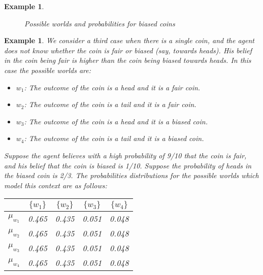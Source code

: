\documentclass[12pt]{article}
\newtheorem{example}[theorem]{Example}
\begin{document}
\begin{example}
{\begin{figure}
\begin{center}
\begin{tikzpicture}[->,>=stealth',shorten >=1pt,auto,node distance=3cm,main node/.style={}]
\end{tikzpicture}
\caption{Possible worlds and probabilities for biased coins}
\label{fig:possiblewu}
\end{center}
\end{figure}}

\end{example}

\begin{example}{\em We consider a third case when there is a single coin, and the agent does not know whether the coin is fair or biased (say, towards heads). His belief in the coin being fair is higher than the coin being biased towards heads. In this case the possible worlds are:
\begin{itemize}
\item $w_1$: The outcome of the coin is a head and it is a fair coin.
\item $w_2$: The outcome of the coin is a tail and it is a fair coin.
\item $w_3$: The outcome of the coin is a head and it is a biased coin.
\item $w_4$: The outcome of the coin is a tail and it is a biased coin.

\end{itemize}

Suppose the agent believes with a high probability of 9/10 that the coin is fair, and his belief that the coin is biased is 1/10. Suppose the probability of heads in the biased coin is 2/3. The probabilities distributions for the possible worlds which model this context are as follows: 
\begin{center}
\begin{tabular}{|c|c|c|c|c|}
\hline
&  $\{w_1\}$ &$\{w_2\}$ &$\{w_3\}$ & $\{w_4\}$\\ 
\hline
$\mu_{w_1}$& 0.465 & 0.435 & 0.051 & 0.048\\ 
\hline
$\mu_{w_2}$& 0.465 & 0.435 & 0.051 & 0.048\\ 
\hline
$\mu_{w_3}$& 0.465 & 0.435 & 0.051 & 0.048\\ 
\hline
$\mu_{w_4}$& 0.465 & 0.435 & 0.051 & 0.048\\ 
\hline
\end{tabular}
\end{center}
\begin{figure}
\begin{center}
\begin{tikzpicture}[->,>=stealth',shorten >=1pt,auto,node distance=3cm,main node/.style={}]


\end{tikzpicture}
\end{center}
\end{figure}}
\end{example}
\end{document}
